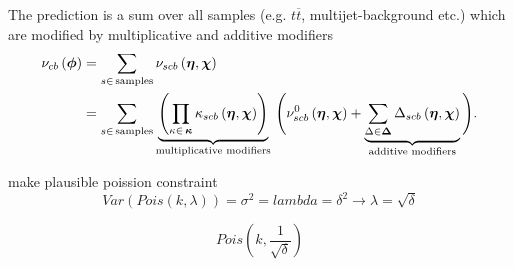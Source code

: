 The prediction is a sum over all samples (e.g. $t\overline{t}$, multijet-background etc.) which are modified by multiplicative and additive modifiers
\begin{align}
    \nu_{cb}\left(\bm{\phi}\right) &= \sum_{s\in\mathrm{\,samples}} \nu_{scb}\left(\bm{\eta},\bm{\chi}\right)\\ &= \sum_{s\in\mathrm{\,samples}}\underbrace{\left(\prod_{\kappa\in\,\bm{\kappa}} \kappa_{scb}\left(\bm{\eta},\bm{\chi}\right)\right)}_{\text{multiplicative modifiers}}\, \Bigg(\nu_{scb}^0\left(\bm{\eta}, \bm{\chi}\right) + \underbrace{\sum_{\Delta\in\bm{\Delta}} \Delta_{scb}\left(\bm{\eta},\bm{\chi}\right)}_{\text{additive modifiers}}\Bigg).
\end{align}


make plausible poission constraint
\begin{equation}
    Var(Pois(k,\lambda))=\sigma^2=lambda=\delta^2 \rightarrow \lambda =\sqrt{\delta}
\end{equation}

\begin{equation}
    Pois(k,\frac{1}{\sqrt{\delta}})
\end{equation}
